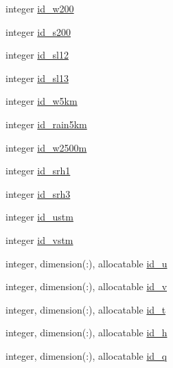 \begin{DoxyCompactItemize}
\item 
integer \hyperlink{structfv__arrays__mod_1_1fv__diag__type_ac4bd255079b0c5f4caf0c9d41ba9d3ad}{id\-\_\-w200}
\item 
integer \hyperlink{structfv__arrays__mod_1_1fv__diag__type_a86c125a2328f26609335ff0ee7ba18c2}{id\-\_\-s200}
\item 
integer \hyperlink{structfv__arrays__mod_1_1fv__diag__type_ad6f97fc73d6b6fe4abf3a11c7add0780}{id\-\_\-sl12}
\item 
integer \hyperlink{structfv__arrays__mod_1_1fv__diag__type_ae1df4b3d52e38a50ee23a1892b3750e1}{id\-\_\-sl13}
\item 
integer \hyperlink{structfv__arrays__mod_1_1fv__diag__type_ad9a73de5176e49b463cfbdeac1e1a45a}{id\-\_\-w5km}
\item 
integer \hyperlink{structfv__arrays__mod_1_1fv__diag__type_ae7c4203f1cc15c9eeb980725bfca9470}{id\-\_\-rain5km}
\item 
integer \hyperlink{structfv__arrays__mod_1_1fv__diag__type_a8d2a3ba0cfb66ff8938923fd1ba93326}{id\-\_\-w2500m}
\item 
integer \hyperlink{structfv__arrays__mod_1_1fv__diag__type_a75906819114afc7fc5718b5a788bafc3}{id\-\_\-srh1}
\item 
integer \hyperlink{structfv__arrays__mod_1_1fv__diag__type_a31e4e8d5c3aadfef8632e751ffc6d8d8}{id\-\_\-srh3}
\item 
integer \hyperlink{structfv__arrays__mod_1_1fv__diag__type_ae0138627f0c753814f42290b958d72ec}{id\-\_\-ustm}
\item 
integer \hyperlink{structfv__arrays__mod_1_1fv__diag__type_acf7ed5161bddfa6993c5847bc9d4e07f}{id\-\_\-vstm}
\item 
integer, dimension(\-:), allocatable \hyperlink{structfv__arrays__mod_1_1fv__diag__type_a257500cfcef6190a0945f608a8c3477c}{id\-\_\-u}
\item 
integer, dimension(\-:), allocatable \hyperlink{structfv__arrays__mod_1_1fv__diag__type_afe1d5ee644c08fc85ab9f382b560c008}{id\-\_\-v}
\item 
integer, dimension(\-:), allocatable \hyperlink{structfv__arrays__mod_1_1fv__diag__type_a1ff1bb7f29693c8bf383533a4283b1db}{id\-\_\-t}
\item 
integer, dimension(\-:), allocatable \hyperlink{structfv__arrays__mod_1_1fv__diag__type_ac49e6fb49faa9aa7675f6bd9d903be27}{id\-\_\-h}
\item 
integer, dimension(\-:), allocatable \hyperlink{structfv__arrays__mod_1_1fv__diag__type_a1f8f228e034551cd50ab5f8bad1fe2ce}{id\-\_\-q}

\end{DoxyCompactItemize}
